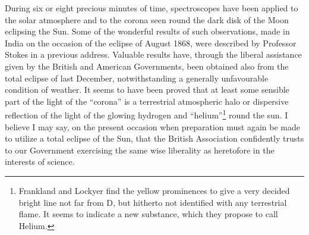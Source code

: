 \documentclass[a4paper, 11pt, oneside, english]{article}
\begin{document}
During six or eight precious minutes of time, spectroscopes have been applied to the solar atmosphere and to the corona seen round the dark disk of the Moon eclipsing the Sun. Some of the wonderful results of such observations, made in India on the occasion of the eclipse of August 1868, were described by Professor Stokes in a previous address. Valuable results have, through the liberal assistance given by the British and American Governments, been obtained also from the total eclipse of last December, notwithstanding a generally unfavourable condition of weather. It seems to have been proved that at least some sensible part of the light of the ``corona'' is a terrestrial atmospheric halo or dispersive reflection of the light of the glowing hydrogen and ``helium''\footnote{Frankland and Lockyer find the yellow prominences to give a very decided bright line not far from D, but hitherto not identified with any terrestrial flame. It seems to indicate a new substance, which they propose to call Helium.} round the sun. I believe I may say, on the present occasion when preparation must again be made to utilize a total eclipse of the Sun, that the British Association confidently trusts to our Government exercising the same wise liberality as heretofore in the interests of science.
\end{document}

